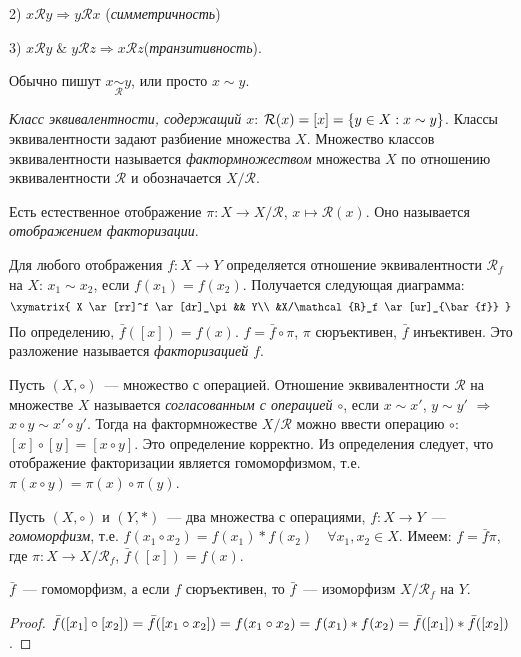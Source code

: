 \documentclass[a4paper]{article}
\newcommand*{\p}[1]{#1\nobreak\discretionary{}{\hbox{$\mathsurround=0pt #1$}}{}}
\begin{document}
2) $x\mathcal{R}y\Rightarrow y\mathcal{R}x$\quad
(\emph{симметричность})

3) $x\mathcal{R}y\; \& \;y\mathcal{R}z\Rightarrow
x\mathcal{R}z$\quad (\emph{транзитивность}).

Обычно пишут $x\mathop{\sim}\limits_{\mathcal{R}}y$, или просто
$x\sim y$.

\emph{Класс эквивалентности, содержащий $x$}:
$\mathcal{R}(x)=[x]=\{y\in X: x\p\sim y\}$. Классы эквивалентности
задают разбиение множества $X$. Множество классов эквивалентности
называется \emph{фактормножеством} множества $X$ по отношению
эквивалентности $\mathcal{R}$ и обозначается $X/\mathcal{R}$.

Есть естественное отображение $\pi\colon X\to X/\mathcal{R}$,
$x\mapsto \mathcal{R}(x)$. Оно называется \emph{отображением
факторизации}.

Для любого отображения $f\colon X\to Y$ определяется отношение
эквивалентности $\mathcal{R}_f$ на $X$: $x_1\sim x_2$, если
$f(x_1)=f(x_2)$. Получается следующая диаграмма:
$$\xymatrix{
 X \ar[rr]^f \ar[dr]_\pi && Y\\
&X/\mathcal{R}_f \ar[ur]_{\bar{f}} }$$ По определению,
$\bar{f}([x])=f(x)$. $f=\bar{f}\circ \pi$, $\pi$ сюръективен,
$\bar{f}$ инъективен. Это разложение называется \emph{факторизацией
$f$}.

Пусть $(X, \circ)$~--- множество с операцией. Отношение
эквивалентности $\mathcal{R}$ на множестве $X$ называется
\emph{согласованным с операцией $\circ$}, если $x\sim x'$, $y\sim
y'$ $\Rightarrow$ $x\circ y\sim x'\circ y'$. Тогда на
фактормножестве $X/\mathcal{R}$ можно ввести операцию $\circ$:
$[x]\circ [y]=[x\circ y]$. Это определение корректно. Из определения
следует, что отображение факторизации является гомоморфизмом, т.е.
$\pi(x\circ y)=\pi(x)\circ\pi(y)$.

Пусть $(X,\circ)$ и $(Y, \ast)$~--- два множества с операциями,
$f\colon X\to Y$~--- \emph{гомоморфизм}, т.е. $f(x_1\circ
x_2)=f(x_1)\ast f(x_2)\quad \forall x_1,x_2\in X$. Имеем:
$f=\bar{f}\pi$, где $\pi\colon X\to X/\mathcal{R}_f$,
$\bar{f}([x])=f(x)$.

\begin{theorem}
$\bar{f}$~--- гомоморфизм, а если $f$ сюръективен, то $\bar{f}$~---
изоморфизм $X/\mathcal{R}_f$ на $Y$.
\end{theorem}

\begin{proof}
$\bar{f}([x_1]\circ[x_2])=\bar{f}([x_1\circ x_2])=f(x_1\circ
x_2)=f(x_1)\ast f(x_2)\p=\bar{f}([x_1])\ast \bar{f}([x_2])$.
\end{proof}
\end{document}
